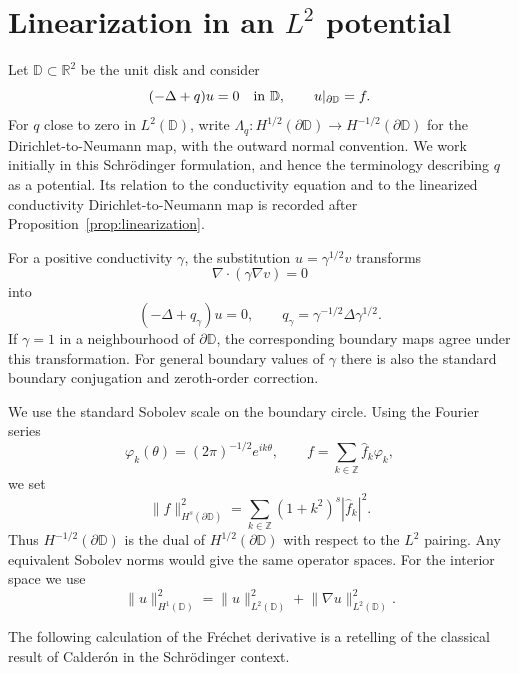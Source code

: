 \IfFileExists{iopjournal.cls}{\documentclass{iopjournal}}{\documentclass{iopjournal-draft}}
\theoremstyle{definition}
\theoremstyle{remark}
\newcommand{\D}{\mathbb D}
\newcommand{\norm}[1]{\lVert #1\rVert}
\newcommand{\R}{\mathbb R}
\numberwithin{equation}{section}
\begin{document}
\section{Linearization in an $L^2$ potential}
\label{sec:linearization}

Let $\D\subset\R^2$ be the unit disk and consider
\begin{equation}
 (-\Delta+q)u=0\quad\hbox{in }\D,
 \qquad u|_{\partial\D}=f.
 \label{eq:schrodinger-pde}
\end{equation}
For $q$ close to zero in $L^2(\D)$, write $\Lambda_q:H^{1/2}(\partial\D)\to H^{-1/2}(\partial\D)$ for the Dirichlet-to-Neumann map, with the outward normal convention. 
We work initially in this Schr\"odinger formulation, and hence the terminology describing $q$ as a potential.  Its relation to
the conductivity equation and to the linearized conductivity
Dirichlet-to-Neumann map is recorded after Proposition~\ref{prop:linearization}.

For a positive conductivity $\gamma$, the substitution
$u=\gamma^{1/2}v$ transforms
\begin{equation} \label{eq:conductivity}
\nabla\cdot(\gamma\nabla v)=0
\end{equation}
into
\begin{equation}\label{eq:gammaq}
(-\Delta+q_\gamma)u=0,
\qquad
q_\gamma=\gamma^{-1/2}\Delta\gamma^{1/2}.
\end{equation}
If $\gamma=1$ in a neighbourhood of $\partial\D$, the corresponding
boundary maps agree under this transformation.  For general boundary
values of $\gamma$ there is also the standard boundary conjugation and
zeroth-order correction.

We use the standard Sobolev scale on the boundary circle.  Using the Fourier series
\[
\varphi_k(\theta)=(2\pi)^{-1/2}e^{ik\theta},
\qquad
f=\sum_{k\in\mathbb Z}\widehat f_k\varphi_k,
\]
we set
\[
\norm{f}_{H^s(\partial\D)}^2
=
\sum_{k\in\mathbb Z}(1+k^2)^s|\widehat f_k|^2.
\]
Thus $H^{-1/2}(\partial\D)$ is the dual of
$H^{1/2}(\partial\D)$ with respect to the $L^2$ pairing.
Any equivalent Sobolev norms would give the same operator spaces.
For the interior space we use
\[
\norm{u}_{H^1(\D)}^2
=
\norm{u}_{L^2(\D)}^2+\norm{\nabla u}_{L^2(\D)}^2.
\] 

The following calculation of the Fr\'echet derivative is a retelling of the classical result of Calder\'on \cite{Calderon1980} in the Schr\"odinger context. 
 
\end{document}
